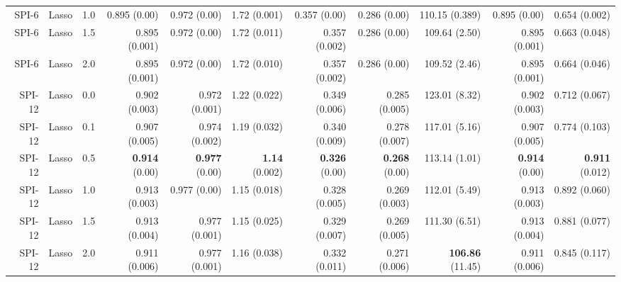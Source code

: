 \begin{table}
\begin{tabular}{rrrrrrrrrrr}
  SPI-6 &     Lasso &   1.0 &         0.895 (0.00) &        0.972 (0.00) &        1.72 (0.001) &         0.357 (0.00) &         0.286 (0.00) &        110.15 (0.389) &         0.895 (0.00) &        0.654 (0.002) \\
  SPI-6 &     Lasso &   1.5 &        0.895 (0.001) &        0.972 (0.00) &        1.72 (0.011) &        0.357 (0.002) &         0.286 (0.00) &         109.64 (2.50) &        0.895 (0.001) &        0.663 (0.048) \\
  SPI-6 &     Lasso &   2.0 &        0.895 (0.001) &        0.972 (0.00) &        1.72 (0.010) &        0.357 (0.002) &         0.286 (0.00) &         109.52 (2.46) &        0.895 (0.001) &        0.664 (0.046) \\
 SPI-12 &     Lasso &   0.0 &        0.902 (0.003) &       0.972 (0.001) &        1.22 (0.022) &        0.349 (0.006) &        0.285 (0.005) &         123.01 (8.32) &        0.902 (0.003) &        0.712 (0.067) \\
 SPI-12 &     Lasso &   0.1 &        0.907 (0.005) &       0.974 (0.002) &        1.19 (0.032) &        0.340 (0.009) &        0.278 (0.007) &         117.01 (5.16) &        0.907 (0.005) &        0.774 (0.103) \\
 SPI-12 &     Lasso &   0.5 &  { \bf 0.914} (0.00) & { \bf 0.977} (0.00) & { \bf 1.14} (0.002) &  { \bf 0.326} (0.00) &  { \bf 0.268} (0.00) &         113.14 (1.01) &  { \bf 0.914} (0.00) & { \bf 0.911} (0.012) \\
 SPI-12 &     Lasso &   1.0 &        0.913 (0.003) &        0.977 (0.00) &        1.15 (0.018) &        0.328 (0.005) &        0.269 (0.003) &         112.01 (5.49) &        0.913 (0.003) &        0.892 (0.060) \\
 SPI-12 &     Lasso &   1.5 &        0.913 (0.004) &       0.977 (0.001) &        1.15 (0.025) &        0.329 (0.007) &        0.269 (0.005) &         111.30 (6.51) &        0.913 (0.004) &        0.881 (0.077) \\
 SPI-12 &     Lasso &   2.0 &        0.911 (0.006) &       0.977 (0.001) &        1.16 (0.038) &        0.332 (0.011) &        0.271 (0.006) & { \bf 106.86} (11.45) &        0.911 (0.006) &        0.845 (0.117) \\
\bottomrule
\end{tabular}
\end{table}
